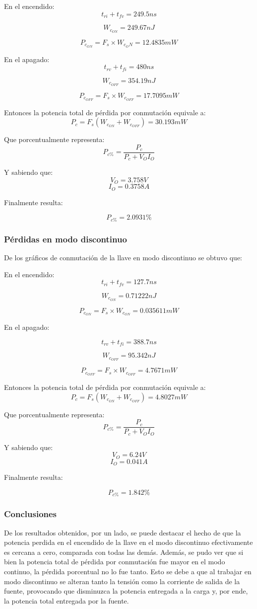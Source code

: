 \documentclass[e4_tp1_main.tex]{subfiles}
\begin{document}
	En el encendido:
	\[t_{ri}+t_{fv}=249.5ns\]
	
	\[W_{c_{ON}}=249.67nJ\]
	
	\[P_{c_{ON}}=F_s\times W_{c_ON}=12.4835mW\]
	
	En el apagado:
	\[t_{rv}+t_{fi}=480ns\]
	
	\[W_{c_{OFF}}=354.19nJ \]
	
	\[P_{c_{OFF}}=F_s\times W_{c_{OFF}}=17.7095mW\]
	
	Entonces la potencia total de pérdida por conmutación equivale a:
	\[P_c=F_s(W_{c_{ON}}+W_{c_{OFF}})=30.193mW\]
	
	Que porcentualmente representa:
	\[P_{c\%}=\frac{P_c}{P_c+V_OI_O}\]
	
	Y sabiendo que:
	\[V_O=3.758V\]
	\[I_O=0.3758A\]
	
	Finalmente resulta:
	
	
	\[P_{c\%}=2.0931\%\]
	
	
	
	\subsubsection{Pérdidas en modo discontinuo}
	De los gráficos de conmutación de la llave en modo discontinuo se obtuvo que:
	
	En el encendido:
	\[t_{ri}+t_{fv}=127.7ns\]
	
	
	
	\[W_{c_{ON}}=0.71222nJ\]
	
	
	
	\[P_{c_{ON}}=F_s\times W_{c_{ON}}=0.035611mW\]
	
	
	En el apagado:
	
	\[t_{rv}+t_{fi}=388.7ns\]
	
	
	
	\[W_{c_{OFF}}=95.342nJ\]
	
	\[P_{c_{OFF}}=F_s\times W_{c_{OFF}}=4.7671mW\]
	
	Entonces la potencia total de pérdida por conmutación equivale a:
	\[P_c=F_s(W_{c_{ON}}+W_{c_{OFF}})=4.8027mW\]
	
	Que porcentualmente representa:
	\[P_{c\%}=\frac{P_c}{P_c+V_OI_O}\]
	
	Y sabiendo que:
	\[V_O=6.24V\]
	\[I_O=0.041A\]
	
	Finalmente resulta:
	
	\[P_{c\%}=1.842\%\]
	
	\subsubsection{Conclusiones}
	De los resultados obtenidos, por un lado, se puede destacar el hecho de que la potencia perdida en el encendido de la llave en el modo discontinuo  efectivamente es cercana a cero, comparada con todas las demás. Además, se pudo ver que si bien la potencia total de pérdida por conmutación fue mayor en el modo continuo, la pérdida porcentual no lo fue tanto. Esto se debe a que al trabajar en modo discontinuo se alteran tanto la tensión como la corriente de salida de la fuente, provocando que disminuzca la potencia entregada a la carga y, por ende, la potencia total entregada por la fuente. 
	
\end{document}
